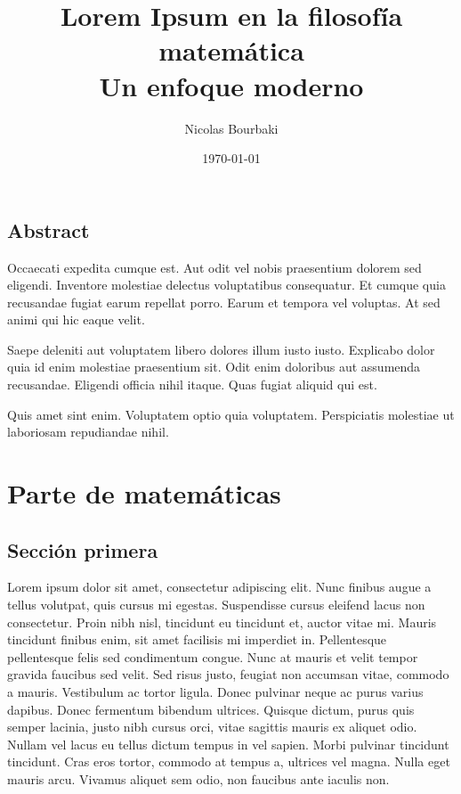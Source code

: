 \documentclass[oneside,openright,titlepage,numbers=noenddot,openany,headinclude,footinclude=true,cleardoublepage=empty,abstractoff,BCOR=5mm,paper=a4,fontsize=12pt,ngerman,spanish,american]{scrreprt}
\author{Nicolas Bourbaki}
\date{\today}
\title{Lorem Ipsum en la filosofía matemática\\\medskip
\large Un enfoque moderno}
\begin{document}
\maketitle
\tableofcontents


\chapter*{Abstract}
Occaecati expedita cumque est. Aut odit vel nobis praesentium dolorem
sed eligendi. Inventore molestiae delectus voluptatibus
consequatur. Et cumque quia recusandae fugiat earum repellat
porro. Earum et tempora vel voluptas. At sed animi qui hic eaque
velit.

Saepe deleniti aut voluptatem libero dolores illum iusto
iusto. Explicabo dolor quia id enim molestiae praesentium sit. Odit
enim doloribus aut assumenda recusandae. Eligendi officia nihil
itaque. Quas fugiat aliquid qui est.

Quis amet sint enim. Voluptatem optio quia voluptatem. Perspiciatis
molestiae ut laboriosam repudiandae nihil.


\part{Parte de matemáticas}

\chapter{Sección primera}

Lorem ipsum dolor sit amet, consectetur adipiscing elit. Nunc finibus
augue a tellus volutpat, quis cursus mi egestas. Suspendisse cursus
eleifend lacus non consectetur. Proin nibh nisl, tincidunt eu
tincidunt et, auctor vitae mi. Mauris tincidunt finibus enim, sit amet
facilisis mi imperdiet in. Pellentesque pellentesque felis sed
condimentum congue. Nunc at mauris et velit tempor gravida faucibus
sed velit. Sed risus justo, feugiat non accumsan vitae, commodo a
mauris. Vestibulum ac tortor ligula. Donec pulvinar neque ac purus
varius dapibus. Donec fermentum bibendum ultrices. Quisque dictum,
purus quis semper lacinia, justo nibh cursus orci, vitae sagittis
mauris ex aliquet odio. Nullam vel lacus eu tellus dictum tempus in
vel sapien. Morbi pulvinar tincidunt tincidunt. Cras eros tortor,
commodo at tempus a, ultrices vel magna. Nulla eget mauris
arcu. Vivamus aliquet sem odio, non faucibus ante iaculis non.
\end{document}
